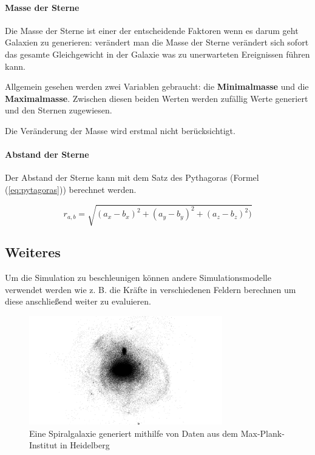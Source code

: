 \paragraph{Masse der Sterne}
Die Masse der Sterne ist einer der entscheidende Faktoren wenn es darum geht
Galaxien zu generieren: verändert man die Masse der Sterne verändert sich sofort
das gesamte Gleichgewicht in der Galaxie was zu unerwarteten Ereignissen führen
kann.
\par Allgemein gesehen werden zwei Variablen gebraucht: die
\textbf{Minimalmasse} und die \textbf{Maximalmasse}. Zwischen diesen beiden
Werten werden zufällig Werte generiert und den Sternen zugewiesen.
\par Die Veränderung der Masse wird erstmal nicht berücksichtigt.

\paragraph{Abstand der Sterne}
Der Abstand der Sterne kann mit dem Satz des Pythagoras (Formel
(\ref{eq:pytagoras})) berechnet werden.

\begin{equation}\label{eq:pytagoras}
  r_{a, b} = \sqrt{(a_x - b_x)^2 + (a_y - b_y)^2 + (a_z - b_z)^2)}
\end{equation}

\subsection{Weiteres}
Um die Simulation zu beschleunigen können andere Simulationsmodelle
verwendet werden wie z. B. die Kräfte in verschiedenen Feldern berechnen um
diese anschließend weiter zu evaluieren.

\begin{figure}
  \centering
  \includegraphics[width=0.75\textwidth]{figs/spiralgalaxy}
  \caption{Eine Spiralgalaxie generiert mithilfe von Daten aus dem Max-Plank-Institut in Heidelberg}
  \label{fig:spiralgalaxy}
\end{figure}
